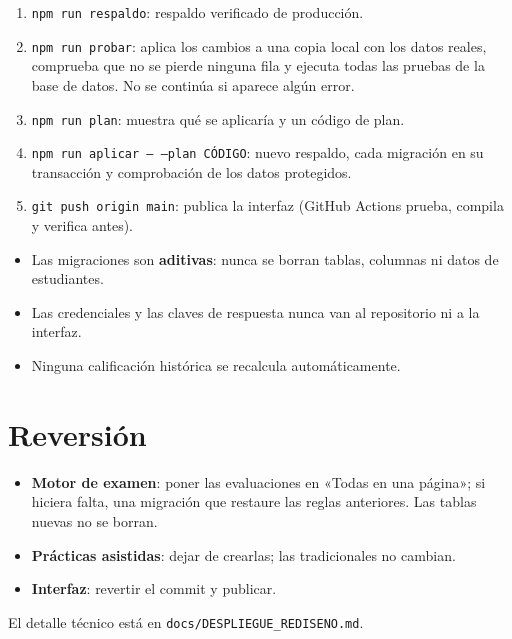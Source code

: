 \documentclass[11pt,a4paper,oneside]{book}
\begin{document}
\begin{enumerate}
  \item \texttt{npm run respaldo}: respaldo verificado de producción.
  \item \texttt{npm run probar}: aplica los cambios a una copia local con los datos reales, comprueba que no se
        pierde ninguna fila y ejecuta todas las pruebas de la base de datos. No se continúa si aparece algún error.
  \item \texttt{npm run plan}: muestra qué se aplicaría y un código de plan.
  \item \texttt{npm run aplicar -- --plan CÓDIGO}: nuevo respaldo, cada migración en su transacción y comprobación
        de los datos protegidos.
  \item \texttt{git push origin main}: publica la interfaz (GitHub Actions prueba, compila y verifica antes).
\end{enumerate}

\begin{importante}
\begin{itemize}
  \item Las migraciones son \textbf{aditivas}: nunca se borran tablas, columnas ni datos de estudiantes.
  \item Las credenciales y las claves de respuesta nunca van al repositorio ni a la interfaz.
  \item Ninguna calificación histórica se recalcula automáticamente.
\end{itemize}
\end{importante}

\section{Reversión}
\begin{itemize}
  \item \textbf{Motor de examen}: poner las evaluaciones en «Todas en una página»; si hiciera falta, una migración que
        restaure las reglas anteriores. Las tablas nuevas no se borran.
  \item \textbf{Prácticas asistidas}: dejar de crearlas; las tradicionales no cambian.
  \item \textbf{Interfaz}: revertir el commit y publicar.
\end{itemize}
El detalle técnico está en \texttt{docs/DESPLIEGUE\_REDISENO.md}.

\appendix
\end{document}
